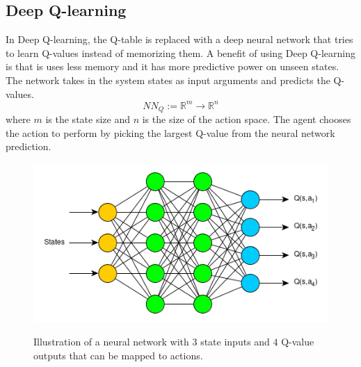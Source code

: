\documentclass[final]{LTHtwocol} %
\begin{document}
\subsection{Deep Q-learning}
In Deep Q-learning, the Q-table is replaced with a deep neural network \cite{Deep_Q_Learning_First} that tries to learn Q-values instead of memorizing them.
A benefit of using Deep Q-learning is that is uses less memory and it has more predictive power on unseen states.
The network takes in the system states as input arguments and predicts the Q-values.
\begin{equation}
	\label{eqn:neural_network_mapping}
	NN_Q := \mathbb{R}^m \to \mathbb{R}^n
\end{equation}
where $m$ is the state size and $n$ is the size of the action space.
The agent chooses the action to perform by picking the largest Q-value from the neural network prediction.
\begin{figure}[htp]
	\centering
	\includegraphics[width=0.9\columnwidth]{figures/q_network.png}
	\label{fig:q_network_illustration}
	\caption{Illustration of a neural network with $3$ state inputs and $4$ Q-value outputs that can be mapped to actions.}
\end{figure}
\end{document}
